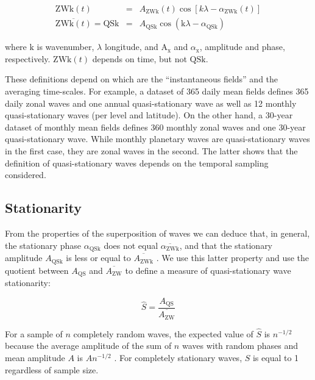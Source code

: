 \documentclass[draft,linenumbers]{agujournal2018}
\begin{document}
\begin{linenomath*}
\begin{eqnarray}\label{eq:ZW}
\mathrm{ZWk}(t) & = & A_\mathrm{ZWk}(t)\cos \left [ k\lambda - \alpha_\mathrm{ZWk}(t) \right ] \\ 
\overline{\mathrm{ZWk}(t)} = \mathrm{QSk} & = & A_\mathrm{QSk}\cos \left (  \mathrm{k}\lambda - \alpha_\mathrm{QSk} \right ) \label{eq:QS}
\end{eqnarray}
\end{linenomath*}

where \(\mathrm{k}\) is wavenumber, \(\lambda\) longitude, and
\(\mathrm{A_{x}}\) and \(\alpha_\mathrm{x}\), amplitude and phase,
respectively. \(\mathrm{ZWk}(t)\) depends on time, but not
\(\mathrm{QSk}\).

These definitions depend on which are the ``instantaneous fields'' and
the averaging time-scales. For example, a dataset of 365 daily mean
fields defines 365 daily zonal waves and one annual quasi-stationary
wave as well as 12 monthly quasi-stationary waves (per level and
latitude). On the other hand, a 30-year dataset of monthly mean fields
defines 360 monthly zonal waves and one 30-year quasi-stationary wave.
While monthly planetary waves are quasi-stationary waves in the first
case, they are zonal waves in the second. The latter shows that the
definition of quasi-stationary waves depends on the temporal sampling
considered.

\subsection{Stationarity}

From the properties of the superposition of waves we can deduce that, in
general, the stationary phase \(\alpha_\mathrm{QSk}\) does not equal
\(\overline{\alpha_\mathrm{ZWk}}\), and that the stationary amplitude
\(A_\mathrm{QSk}\) is less or equal to \(\overline{A_\mathrm{ZWk}}\)
\citep{pain2005}. We use this latter property and use the quotient
between \(A_\mathrm{QS}\) and \(\overline{A_\mathrm{ZW}}\) to define a
measure of quasi-stationary wave stationarity:

\begin{linenomath*}
\begin{equation}\label{eq:S}
\hat{S} = \frac{A_\mathrm{QS}}{\overline{A_\mathrm{ZW}}}
\end{equation}
\end{linenomath*}

For a sample of \(n\) completely random waves, the expected value of
\(\hat{S}\) is \(n^{-1/2}\) because the average amplitude of the sum of
\(n\) waves with random phases and mean amplitude \(A\) is \(An^{-1/2}\)
\citep{pain2005}. For completely stationary waves, \(\hat{S}\) is equal
to 1 regardless of sample size.
\end{document}
